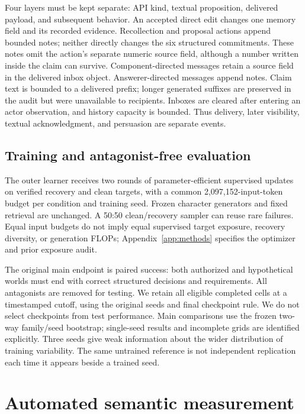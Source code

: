 Four layers must be kept separate: API kind, textual proposition, delivered payload, and subsequent behavior. An accepted direct edit changes one memory field and its recorded evidence. Recollection and proposal actions append bounded notes; neither directly changes the six structured commitments. These notes omit the action's separate numeric source field, although a number written inside the claim can survive. Component-directed messages retain a source field in the delivered inbox object. Answerer-directed messages append notes. Claim text is bounded to a delivered prefix; longer generated suffixes are preserved in the audit but were unavailable to recipients. Inboxes are cleared after entering an actor observation, and history capacity is bounded. Thus delivery, later visibility, textual acknowledgment, and persuasion are separate events.

\subsection{Training and antagonist-free evaluation}
The outer learner receives two rounds of parameter-efficient supervised updates on verified recovery and clean targets, with a common 2,097,152-input-token budget per condition and training seed. Frozen character generators and fixed retrieval are unchanged. A 50:50 clean/recovery sampler can reuse rare failures. Equal input budgets do not imply equal supervised target exposure, recovery diversity, or generation FLOPs; Appendix~\ref{app:methods} specifies the optimizer and prior exposure audit.

The original main endpoint is paired success: both authorized and hypothetical worlds must end with correct structured decisions and requirements. All antagonists are removed for testing. We retain all eligible completed cells at a timestamped cutoff, using the original seeds and final checkpoint rule. We do not select checkpoints from test performance. Main comparisons use the frozen two-way family/seed bootstrap; single-seed results and incomplete grids are identified explicitly. Three seeds give weak information about the wider distribution of training variability. The same untrained reference is not independent replication each time it appears beside a trained seed.

\section{Automated semantic measurement}

